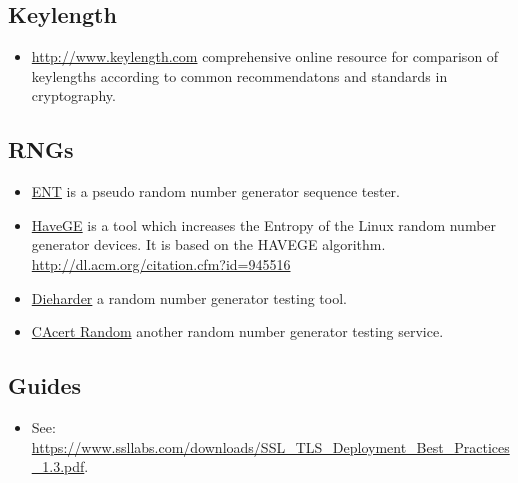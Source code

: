 \subsection{Keylength}
\begin{itemize}
\item \url{http://www.keylength.com} comprehensive online resource for comparison of keylengths according to common recommendatons and standards in cryptography.
\end{itemize}


\subsection{RNGs}

\begin{itemize}
\item \href{http://www.fourmilab.ch/random/}{ENT} is a pseudo random number generator sequence tester.
\item \href{http://www.issihosts.com/haveged/}{HaveGE} is a tool which increases the Entropy of the Linux random number generator devices. It is based on the HAVEGE algorithm. \url{http://dl.acm.org/citation.cfm?id=945516}
\item \href{http://www.phy.duke.edu/~rgb/General/dieharder.php}{Dieharder} a random number generator testing tool.
\item \href{http://www.cacert.at/random/}{CAcert Random} another random number generator testing service.
\end{itemize}

\subsection{Guides}
\begin{itemize}
\item See: \url{https://www.ssllabs.com/downloads/SSL_TLS_Deployment_Best_Practices_1.3.pdf}.
\end{itemize}
